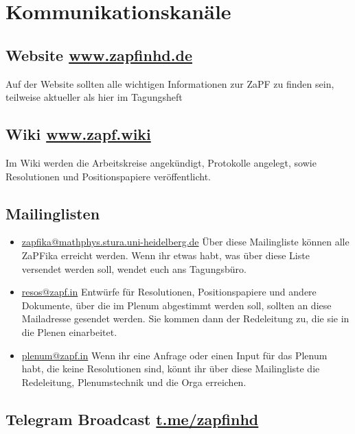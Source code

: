 
\section{Kommunikationskanäle}

\subsection{Website \hfill \url{www.zapfinhd.de}}

\noindent Auf der Website sollten alle wichtigen Informationen zur ZaPF zu finden sein, teilweise aktueller als hier im Tagungsheft

\subsection{Wiki \hfill \url{www.zapf.wiki}}

\noindent Im Wiki werden die Arbeitskreise angekündigt, Protokolle angelegt, sowie Resolutionen und Positionspapiere veröffentlicht.

\subsection{Mailinglisten}

\begin{itemize}%
\item[\faEnvelope] \url{zapfika@mathphys.stura.uni-heidelberg.de} Über diese Mailingliste können alle ZaPFika erreicht werden. Wenn ihr etwas habt, was über diese Liste versendet werden soll, wendet euch ans Tagungsbüro.

\item[\faEnvelope] \url{resos@zapf.in} Entwürfe für Resolutionen, Positionspapiere und andere Dokumente, über die im Plenum abgestimmt werden soll, sollten an diese Mailadresse gesendet werden. Sie kommen dann der Redeleitung zu, die sie in die Plenen einarbeitet.

\item[\faEnvelope] \url{plenum@zapf.in}  Wenn ihr eine Anfrage oder einen Input für das Plenum habt, die keine Resolutionen sind, könnt ihr über diese Mailingliste die Redeleitung, Plenumstechnik und die Orga erreichen.

\end{itemize}

\subsection{Telegram Broadcast \hfill \url{t.me/zapfinhd}} %

